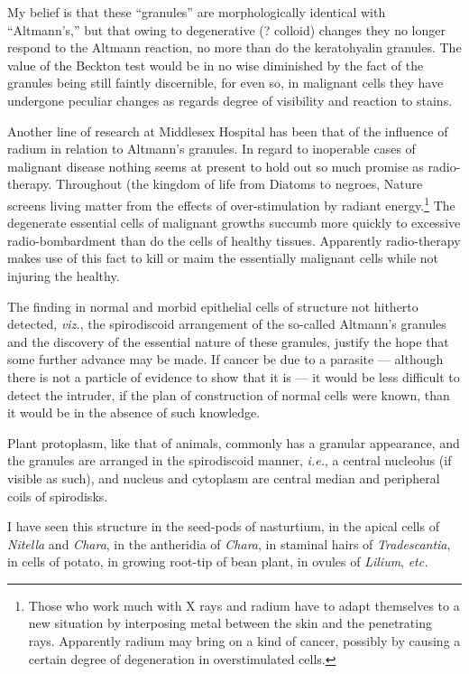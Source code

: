 \documentclass[a4paper, 12pt, oneside, landscape]{article}
\begin{document}
My belief is that these ``granules'' are morphologically identical with ``Altmann's,'' but that owing to degenerative (? colloid) changes they no longer respond to the Altmann reaction, no more than do the keratohyalin granules. The value of the Beckton test would be in no wise diminished by the fact of the granules being still faintly discernible, for even so, in malignant cells they have undergone peculiar changes as regards degree of visibility and reaction to stains.

Another line of research at Middlesex Hospital has been that of the influence of radium in relation to Altmann's granules. In regard to inoperable cases of malignant disease nothing seems at present to hold out so much promise as radio-therapy. Throughout (the kingdom of life from Diatoms to negroes, Nature screens living matter from the effects of over-stimulation by radiant energy.\footnote{Those who work much with X rays and radium have to adapt themselves to a new situation by interposing metal between the skin and the penetrating rays. Apparently radium may bring on a kind of cancer, possibly by causing a certain degree of degeneration in overstimulated cells.} The degenerate essential cells of malignant growths succumb more quickly to excessive radio-bombardment than do the cells of healthy tissues. Apparently radio-therapy makes use of this fact to kill or maim the essentially malignant cells while not injuring the healthy.

The finding in normal and morbid epithelial cells of structure not hitherto detected, \emph{viz.}, the spirodiscoid arrangement of the so-called Altmann's granules and the discovery of the essential nature of these granules, justify the hope that some further advance may be made. If cancer be due to a parasite --- although there is not a particle of evidence to show that it is --- it would be less difficult to detect the intruder, if the plan of construction of normal cells were known, than it would be in the absence of such knowledge.

Plant protoplasm, like that of animals, commonly has a granular appearance, and the granules are arranged in the spirodiscoid manner, \emph{i.e.}, a central nucleolus (if visible as such), and nucleus and cytoplasm are central median and peripheral coils of spirodisks.

I have seen this structure in the seed-pods of nasturtium, in the apical cells of \emph{Nitella} and \emph{Chara}, in the antheridia of \emph{Chara}, in staminal hairs of \emph{Tradescantia}, in cells of potato, in growing root-tip of bean plant, in ovules of \emph{Lilium}, \emph{etc.}
\end{document}
